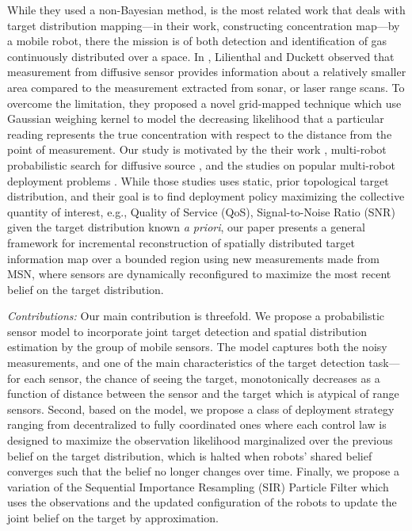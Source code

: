 \documentclass[journal]{IEEEtran}
\begin{document}
While they used a non-Bayesian method, \cite{lilienthal2009statistical} is the most related work that deals with target distribution mapping---in their work, constructing concentration map---by a mobile robot, there the mission is of both detection and identification of gas continuously distributed over a space. In \cite{lilienthal2009statistical}, Lilienthal and Duckett observed that measurement from diffusive sensor provides information about a relatively smaller area compared to the measurement extracted from sonar, or laser range scans. To overcome the limitation, they proposed a novel grid-mapped technique which use Gaussian weighing kernel to model the decreasing likelihood that a particular reading represents the true concentration with respect to the distance from the point of measurement.
Our study is motivated by the their work \cite{lilienthal2009statistical}, multi-robot probabilistic search for diffusive source \cite{ristic2010information}, and the studies on popular multi-robot deployment problems \cite{cortes_coverage_2004}. 
While those studies \cite{cortes_coverage_2004} uses static, prior topological target distribution, and their goal is to find deployment policy maximizing the collective quantity of interest, e.g., Quality of Service (QoS), Signal-to-Noise Ratio (SNR)  given the target distribution known \emph{a priori}, our paper presents a general framework for incremental reconstruction of spatially distributed target information map over a bounded region using new measurements made from MSN, where sensors are dynamically reconfigured to maximize the most recent belief on the target distribution.


\textit{Contributions:}
Our main contribution is threefold.
We propose a probabilistic sensor model to incorporate joint target detection and spatial distribution estimation by the group of mobile sensors. The model captures both the noisy measurements, and one of the main characteristics of the target detection task---for each sensor, the chance of seeing the target, monotonically decreases as a function of distance between the sensor and the target which is atypical of range sensors. 
Second, based on the model, we propose a class of deployment strategy ranging from decentralized to fully coordinated ones where each control law is designed to maximize the observation likelihood marginalized over the previous belief on the target distribution, which is halted when robots' shared belief converges such that the belief no longer changes over time. 
Finally, we propose a variation of the Sequential Importance Resampling (SIR) Particle Filter 
which uses the observations and the updated configuration of the robots to update the joint belief on the target by approximation.
\end{document}
